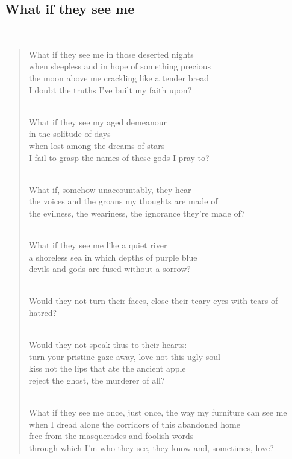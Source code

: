 \documentclass[a4paper, 12pt]{article}
\begin{document}
\pagebreak

\subsection{What if they see me}
~ 
\begin{verse}
    
What if they see me in those deserted nights\\
when sleepless and in hope of something precious\\
the moon above me crackling like a tender bread\\
I doubt the truths I’ve built my faith upon?\\
~ 

What if they see my aged demeanour\\
in the solitude of days\\
when lost among the dreams of stars\\
I fail to grasp the names of these gods I pray to?\\
~ 

What if, somehow unaccountably, they hear\\
the voices and the groans my thoughts are made of\\
the evilness, the weariness, the ignorance they’re made of?\\
~ 

What if they see me like a quiet river\\
a shoreless sea in which depths of purple blue\\
devils and gods are fused without a sorrow?\\
~ 

Would they not turn their faces, close their teary eyes with tears of hatred?\\
~ 

Would they not speak thus to their hearts:\\
turn your pristine gaze away, love not this ugly soul\\
kiss not the lips that ate the ancient apple\\
reject the ghost, the murderer of all?\\
~ 

What if they see me once, just once, the way my furniture can see me\\
when I dread alone the corridors of this abandoned home\\
free from the masquerades and foolish words\\
through which I’m who they see, they know and, sometimes, love?\\
\end{verse}
\end{document}
